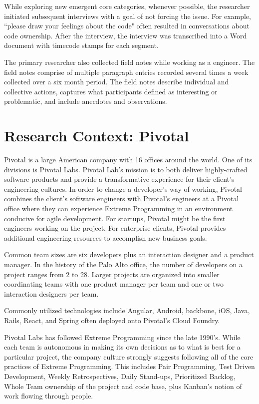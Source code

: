 While exploring new emergent core categories, whenever possible, the researcher initiated subsequent interviews with a goal of not forcing the issue. For example, ``please draw your feelings about the code" often resulted in conversations about code ownership. After the interview, the interview was transcribed into a Word document with timecode stamps for each segment.

The primary researcher also collected field notes while working as a engineer. The field notes comprise of multiple paragraph entries recorded several times a week collected over a six month period. The field notes describe individual and collective actions, captures what participants defined as interesting or problematic, and include anecdotes and observations. 

\section{Research Context: Pivotal}
\label{ResearchContext}
Pivotal is a large American company with 16 offices around the world. One of its divisions is Pivotal Labs. Pivotal Lab's mission is to both deliver highly-crafted software products and provide a transformative experience for their client's engineering cultures. In order to change a developer's way of working, Pivotal combines the client's software engineers with Pivotal's engineers at a Pivotal office where they can experience Extreme Programming in an environment conducive for agile development. For startups, Pivotal might be the first engineers working on the project. For enterprise clients, Pivotal provides additional engineering resources to accomplish new business goals. 

Common team sizes are six developers plus an interaction designer and a product manager. In the history of the Palo Alto office, the number of developers on a project ranges from 2 to 28. Larger projects are organized into smaller coordinating teams with one product manager per team and one or two interaction designers per team.

Commonly utilized technologies include Angular, Android, backbone, iOS, Java, Rails, React, and Spring often deployed onto Pivotal's Cloud Foundry. 

Pivotal Labs has followed Extreme Programming \cite{ExtremeProgramming2004} since the late 1990's. While each team is autonomous in making its own decisions as to what is best for a particular project, the company culture strongly suggests following all of the core practices of Extreme Programming. This includes Pair Programming, Test Driven Development, Weekly Retrospectives, Daily Stand-ups, Prioritized Backlog, Whole Team ownership of the project and code base, plus Kanban's notion of work flowing through people.


